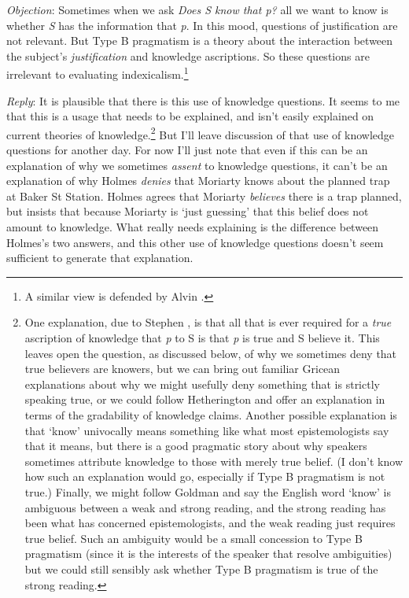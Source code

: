 \bigskip \noindent \textit{Objection}: Sometimes when we ask \textit{Does S know that p?} all we want to know is whether \textit{S} has the information that \textit{p}. In this mood, questions of justification are not relevant. But Type B pragmatism is a theory about the interaction between the subject's \textit{justification} and knowledge ascriptions. So these questions are irrelevant to evaluating indexicalism.\footnote{A similar view is defended by Alvin \citet{Goldman2002}. }

\medskip \noindent \textit{Reply}: It is plausible that there is this use of knowledge questions. It seems to me that this is a usage that needs to be explained, and isn't easily explained on current theories of knowledge.\footnote{One explanation, due to Stephen \citet{Hetherington2001}, is that all that is ever required for a \textit{true} ascription of knowledge that \textit{p} to S is that \textit{p} is true and S believe it. This leaves open the question, as discussed below, of why we sometimes deny that true believers are knowers, but we can bring out familiar Gricean explanations about why we might usefully deny something that is strictly speaking true, or we could follow Hetherington and offer an explanation in terms of the gradability of knowledge claims. Another possible explanation is that `know' univocally means something like what most epistemologists say that it means, but there is a good pragmatic story about why speakers sometimes attribute knowledge to those with merely true belief. (I don't know how such an explanation would go, especially if Type B pragmatism is not true.) Finally, we might follow Goldman and say the English word `know' is ambiguous between a weak and strong reading, and the strong reading has been what has concerned epistemologists, and the weak reading just requires true belief. Such an ambiguity would be a small concession to Type B pragmatism (since it is the interests of the speaker that resolve ambiguities) but we could still sensibly ask whether Type B pragmatism is true of the strong reading.} But I'll leave discussion of that use of knowledge questions for another day. For now I'll just note that even if this can be an explanation of why we sometimes \textit{assent} to knowledge questions, it can't be an explanation of why Holmes \textit{denies} that Moriarty knows about the planned trap at Baker St Station. Holmes agrees that Moriarty \textit{believes} there is a trap planned, but insists that because Moriarty is `just guessing' that this belief does not amount to knowledge. What really needs explaining is the difference between Holmes's two answers, and this other use of knowledge questions doesn't seem sufficient to generate that explanation.

